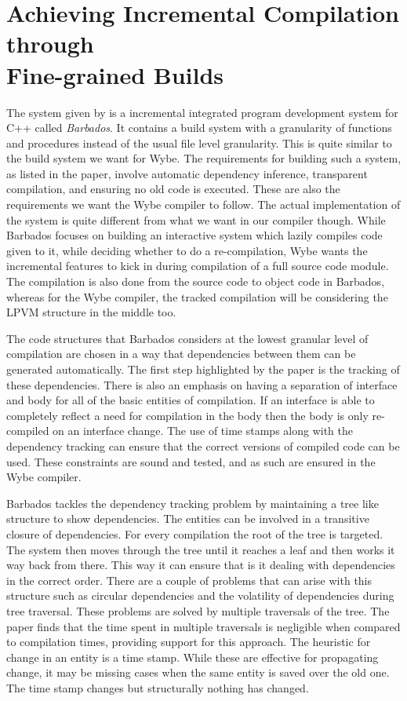

\section{Achieving Incremental Compilation through\\ Fine-grained Builds
  \citep{cpp_compiler}}
\label{sec:cpp_compiler}

The system given by \cite{cpp_compiler} is a incremental integrated program
development system for C++ called \textit{Barbados}. It contains a build system
with a granularity of functions and procedures instead of the usual file level
granularity. This is quite similar to the build system we want for Wybe. The
requirements for building such a system, as listed in the paper, involve
automatic dependency inference, transparent compilation, and ensuring no old
code is executed. These are also the requirements we want the Wybe compiler to
follow. The actual implementation of the system is quite different from what we
want in our compiler though. While Barbados focuses on building an interactive
system which lazily compiles code given to it, while deciding whether to do a
re-compilation, Wybe wants the incremental features to kick in during
compilation of a full source code module. The compilation is also done from the
source code to object code in Barbados, whereas for the Wybe compiler, the
tracked compilation will be considering the LPVM structure in the middle too.

The code structures that Barbados considers at the lowest granular level of
compilation are chosen in a way that dependencies between them can be generated
automatically. The first step highlighted by the paper is the tracking of these
dependencies. There is also an emphasis on having a separation of interface and
body for all of the basic entities of compilation. If an interface is able to
completely reflect a need for compilation in the body then the body is only
re-compiled on an interface change. The use of time stamps along with the
dependency tracking can ensure that the correct versions of compiled code can
be used. These constraints are sound and tested, and as such are ensured in the
Wybe compiler.

Barbados tackles the dependency tracking problem by maintaining a tree like
structure to show dependencies. The entities can be involved in a transitive
closure of dependencies. For every compilation the root of the tree is
targeted. The system then moves through the tree until it reaches a leaf and
then works it way back from there. This way it can ensure that is it dealing
with dependencies in the correct order. There are a couple of problems that can
arise with this structure such as circular dependencies and the volatility of
dependencies during tree traversal. These problems are solved by multiple
traversals of the tree. The paper finds that the time spent in multiple
traversals is negligible when compared to compilation times, providing support
for this approach. The heuristic for change in an entity is a time stamp. While
these are effective for propagating change, it may be missing cases when the
same entity is saved over the old one. The time stamp changes but structurally
nothing has changed.

